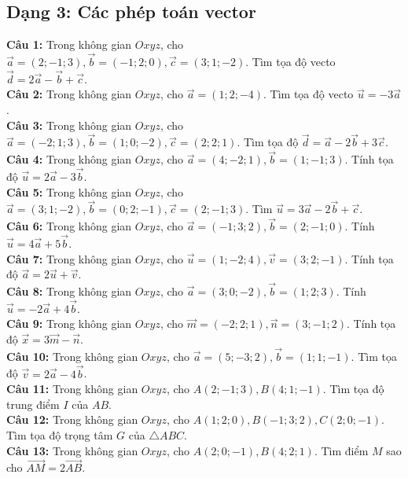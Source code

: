 \documentclass[12pt]{article}
\begin{document}
	\subsection{Dạng 3: Các phép toán vector}
	\begin{btxanh}
		\noindent \textbf{Câu 1:} Trong không gian $Oxyz$, cho $\vec{a} = (2; -1; 3), \vec{b} = (-1; 2; 0), \vec{c} = (3; 1; -2)$. Tìm tọa độ vecto $\vec{d} = 2\vec{a} - \vec{b} + \vec{c}$. \\
		\noindent \textbf{Câu 2:} Trong không gian $Oxyz$, cho $\vec{a} = (1; 2; -4)$. Tìm tọa độ vecto $\vec{u} = -3\vec{a}$. \\
		\noindent \textbf{Câu 3:} Trong không gian $Oxyz$, cho $\vec{a} = (-2; 1; 3), \vec{b} = (1; 0; -2), \vec{c} = (2; 2; 1)$. Tìm tọa độ $\vec{d} = \vec{a} - 2\vec{b} + 3\vec{c}$. \\
		\noindent \textbf{Câu 4:} Trong không gian $Oxyz$, cho $\vec{a} = (4; -2; 1), \vec{b} = (1; -1; 3)$. Tính tọa độ $\vec{u} = 2\vec{a} - 3\vec{b}$. \\
		\noindent \textbf{Câu 5:} Trong không gian $Oxyz$, cho $\vec{a} = (3; 1; -2), \vec{b} = (0; 2; -1), \vec{c} = (2; -1; 3)$. Tìm $\vec{u} = 3\vec{a} - 2\vec{b} + \vec{c}$. \\
		\noindent \textbf{Câu 6:} Trong không gian $Oxyz$, cho $\vec{a} = (-1; 3; 2), \vec{b} = (2; -1; 0)$. Tính $\vec{u} = 4\vec{a} + 5\vec{b}$. \\
		\noindent \textbf{Câu 7:} Trong không gian $Oxyz$, cho $\vec{u} = (1; -2; 4), \vec{v} = (3; 2; -1)$. Tính tọa độ $\vec{a} = 2\vec{u} + \vec{v}$. \\
		\noindent \textbf{Câu 8:} Trong không gian $Oxyz$, cho $\vec{a} = (3; 0; -2), \vec{b} = (1; 2; 3)$. Tính $\vec{u} = -2\vec{a} + 4\vec{b}$. \\
		\noindent \textbf{Câu 9:} Trong không gian $Oxyz$, cho $\vec{m} = (-2; 2; 1), \vec{n} = (3; -1; 2)$. Tính tọa độ $\vec{x} = 3\vec{m} - \vec{n}$. \\
		\noindent \textbf{Câu 10:} Trong không gian $Oxyz$, cho $\vec{a} = (5; -3; 2), \vec{b} = (1; 1; -1)$. Tìm tọa độ $\vec{v} = 2\vec{a} - 4\vec{b}$. \\
		\noindent \textbf{Câu 11:} Trong không gian $Oxyz$, cho $A(2; -1; 3), B(4; 1; -1)$. Tìm tọa độ trung điểm $I$ của $AB$. \\
		\noindent \textbf{Câu 12:} Trong không gian $Oxyz$, cho $A(1; 2; 0), B(-1; 3; 2), C(2; 0; -1)$. Tìm tọa độ trọng tâm $G$ của $\triangle ABC$. \\
		\noindent \textbf{Câu 13:} Trong không gian $Oxyz$, cho $A(2; 0; -1), B(4; 2; 1)$. Tìm điểm $M$ sao cho $\vec{AM} = 2\vec{AB}$. \\

\end{btxanh}
\end{document}
